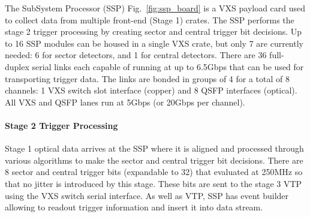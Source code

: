 The SubSystem Processor (SSP) Fig.~\ref{fig:ssp_board} is a VXS payload card used to collect data from multiple front-end (Stage 1) crates. The SSP performs the stage 2 trigger processing by creating sector and central trigger bit decisions. Up to 16 SSP modules can be housed in a single VXS crate, but only 7 are currently needed: 6 for sector detectors, and 1 for central detectors. There are 36 full-duplex serial links each capable of running at up to 6.5Gbps that can be used for transporting trigger data. The links are bonded in groups of 4 for a total of 8 channels: 1 VXS switch slot interface (copper) and 8 QSFP interfaces (optical). All VXS and QSFP lanes run at 5Gbps (or 20Gbps per channel).

\paragraph{Stage 2 Trigger Processing}
Stage 1 optical data arrives at the SSP where it is aligned and processed through various algorithms to make the sector and central trigger bit decisions. There are 8 sector and central trigger bits (expandable to 32) that evaluated at 250MHz so that no jitter is introduced by this stage. These bits are sent to the stage 3 VTP using the VXS switch serial interface. As well as VTP, SSP has event builder allowing to readout trigger information and insert it into data stream.
